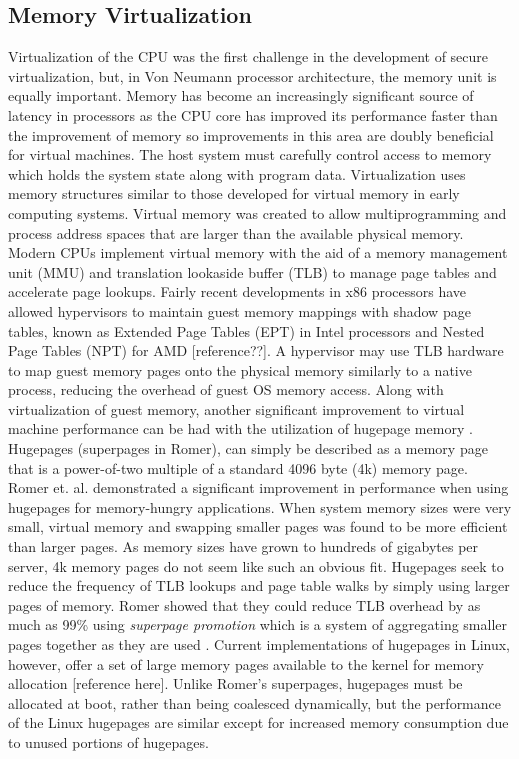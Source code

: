 \subsection{Memory Virtualization}
\label{sec:vt_memory}
Virtualization of the CPU was the first challenge in the development of secure virtualization, but, in Von Neumann processor architecture, the memory unit is equally important.  Memory has become an increasingly  significant source of latency in processors as the CPU core has improved its performance faster than the improvement of memory so improvements in this area are doubly beneficial for virtual machines.  The host system must carefully control access to memory which holds the system state along with program data.  Virtualization uses memory structures similar to those developed for virtual memory in early computing systems.  Virtual memory was created to allow multiprogramming and process address spaces that are larger than the available physical memory.  Modern CPUs implement virtual memory with the aid of a memory management unit (MMU) and translation lookaside buffer (TLB) to manage page tables and accelerate page lookups.  Fairly recent developments in x86 processors have allowed hypervisors to maintain guest memory mappings with shadow page tables, known as Extended Page Tables (EPT) in Intel processors and Nested Page Tables (NPT) for AMD [reference??].  A hypervisor may use TLB hardware to map guest memory pages onto the physical memory similarly to a native process, reducing the overhead of guest OS memory access.  
Along with virtualization of guest memory, another significant improvement to virtual machine performance can be had with the utilization of hugepage memory \autocite{_romer_1}.  Hugepages (superpages in Romer), can simply be described as a memory page that is a power-of-two multiple of a standard 4096 byte (4k) memory page.  Romer et. al. demonstrated a significant improvement in performance when using hugepages for memory-hungry applications.  When system memory sizes were very small, virtual memory and swapping smaller pages was found to be more efficient than larger pages.  As memory sizes have grown to hundreds of gigabytes per server, 4k memory pages do not seem like such an obvious fit.  Hugepages seek to reduce the frequency of TLB lookups and page table walks by simply using larger pages of memory.  Romer showed that they could reduce TLB overhead by as much as 99\% using \emph{superpage promotion} which is a system of aggregating smaller pages together as they are used \autocite{_romer_1}.  Current implementations of hugepages in Linux, however, offer a set of large memory pages available to the kernel for memory allocation [reference here].  Unlike Romer's superpages, hugepages must be allocated at boot, rather than being coalesced dynamically, but the performance of the Linux hugepages are similar except for increased memory consumption due to unused portions of hugepages.  
